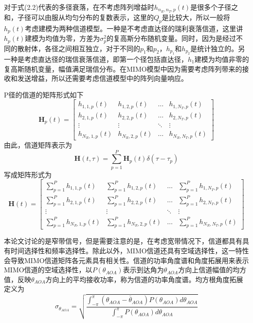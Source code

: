 \documentclass[bachelor,nocolorlinks, printoneside]{seuthesis} %
\begin{document}
\begin{Main}
对于式(2.2)代表的多径衰落，在不考虑阵列增益时$h_{n_{R},n_{T},p}(t)$是很多个子径之和，子径可以由服从均匀分布的复数表示，这里的$Q_{p}$是比较大，所以一般将$h_{p}(t)$考虑建模为两种信道模型。一种是不考虑直达径的瑞利衰落信道，这里讲$h_{p}(t)$建模为均值为零，方差为$\sigma_{p}^{2}$的复高斯分布随机变量。同时，因为是经过不同的散射体，各径之间相互独立，对于不同的$p_{1}$和$p_{2}$，$h_{p_{1}}$和$h_{p_{2}}$是统计独立的。另一种是考虑直达径的瑞信衰落信道，即第一个径包括直达径，$h_{1}$建模为均值非零的复高斯随机变量，幅值满足瑞信分布。在MIMO模型中因为需要考虑阵列带来的接收和发送增益，所以还需要考虑信道模型中的阵列向量响应。

P径的信道的矩阵形式如下
\begin{equation}\label{key}
\mathbf{H}_{p}(t) = \left[ \begin{array}{cccc}
h_{1,1,p}(t) & h_{1,2,p}(t) & \ldots & h_{1,N_{T},p}(t) \\
h_{2,1,p}(t) & h_{2,2,p}(t) & \ldots & h_{2,N_{T},p}(t) \\
\vdots & \vdots & \ddots & \vdots \\
h_{N_{R},1,p}(t) & h_{N_{R},2,p}(t) & \ldots & h_{N_{R},N_{T},p}(t)
\end{array} \right] 
\end{equation}
由此，信道矩阵表示为
\begin{equation}\label{key}
\mathbf{H}(t,\tau) = \sum_{p=1}^{P}\mathbf{H}_{p}(t)\delta(\tau-\tau_{p})
\end{equation}
写成矩阵形式为
\begin{equation}\label{key}
\mathbf{H}(t) = \left[ \begin{array}{cccc}
\sum_{p=1}^{P}h_{1,1,p}(t) & \sum_{p=1}^{P}h_{1,2,p}(t) & \ldots & \sum_{p=1}^{P}h_{1,N_{T},p}(t) \\
\sum_{p=1}^{P}h_{2,1,p}(t) & \sum_{p=1}^{P}h_{2,2,p}(t) & \ldots & \sum_{p=1}^{P}h_{2,N_{T},p}(t) \\
\vdots & \vdots & \ddots & \vdots \\
\sum_{p=1}^{P}h_{N_{R},1,p}(t) & \sum_{p=1}^{P}h_{N_{R},2,p}(t) & \ldots & \sum_{p=1}^{P}h_{N_{R},N_{T},p}(t)
\end{array} \right]
\end{equation}

本论文讨论的是窄带信号，但是需要注意的是，在考虑宽带情况下，信道都具有具有时间选择性和频率选择性。除此以外，MIMO信道还具有空域选择性，这一特性会导致MIMO信道矩阵各元素具有相关性。信道的功率角度谱和角度拓展用来表示MIMO信道的空域选择性，以$P(\theta_{AOA})$表示到达角为$\theta_{AOA}$方向上信道幅值的均方值，反映$\theta_{AOA}$方向上的平均接收功率，称为信道的功率角度谱。均方根角度拓展定义为
\begin{equation}\label{key}
\sigma_{\theta_{AOA}}=\sqrt{
	\frac{\int_{-\pi}^{\pi}(\theta_{AOA}-\overline{\theta}_{AOA})P(\theta_{AOA})d\theta_{AOA}}
	{\int_{-\pi}^{\pi}P(\theta_{AOA})d\theta_{AOA}}
}
\end{equation}


\end{Main}
\end{document}
